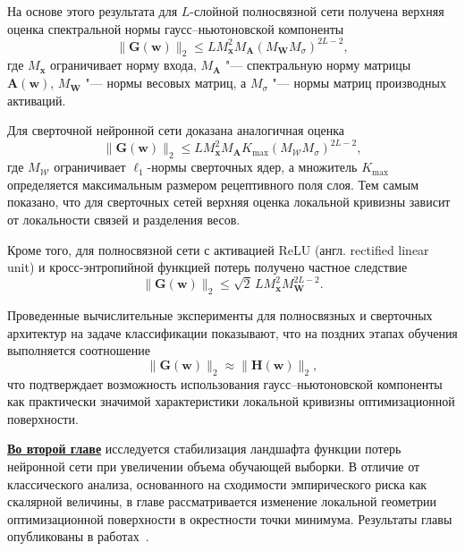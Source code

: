 На основе этого результата для $L$-слойной полносвязной сети получена верхняя оценка спектральной нормы гаусс--ньютоновской компоненты
\begin{equation}
\|\mathbf G(\mathbf w)\|_2
\le
L M_{\mathbf x}^2 M_{\mathbf A}
\left(M_{\mathbf W}M_{\sigma}\right)^{2L-2},
\end{equation}
где $M_{\mathbf x}$ ограничивает норму входа, $M_{\mathbf A}$ "--- спектральную норму матрицы $\mathbf A(\mathbf w)$, $M_{\mathbf W}$ "--- нормы весовых матриц, а $M_{\sigma}$ "--- нормы матриц производных активаций.

Для сверточной нейронной сети доказана аналогичная оценка
\begin{equation}
\|\mathbf G(\mathbf w)\|_2
\le
L M_{\mathbf x}^2 M_{\mathbf A} K_{\max}
\left(M_{\mathcal W}M_{\sigma}\right)^{2L-2},
\end{equation}
где $M_{\mathcal W}$ ограничивает $\ell_1$-нормы сверточных ядер, а множитель $K_{\max}$ определяется максимальным размером рецептивного поля слоя. Тем самым показано, что для сверточных сетей верхняя оценка локальной кривизны зависит от локальности связей и разделения весов.

Кроме того, для полносвязной сети с активацией ReLU (англ. rectified linear unit) и кросс-энтропийной функцией потерь получено частное следствие
\begin{equation}
\|\mathbf G(\mathbf w)\|_2
\le
\sqrt{2}\,L M_{\mathbf x}^2 M_{\mathbf W}^{2L-2}.
\end{equation}

Проведенные вычислительные эксперименты для полносвязных и сверточных архитектур на задаче классификации показывают, что на поздних этапах обучения выполняется соотношение
\[
\|\mathbf G(\mathbf w)\|_2 \approx \|\mathbf H(\mathbf w)\|_2,
\]
что подтверждает возможность использования гаусс--ньютоновской компоненты как практически значимой характеристики локальной кривизны оптимизационной поверхности.

\underline{\textbf{Во второй главе}} исследуется стабилизация ландшафта функции потерь нейронной сети при увеличении объема обучающей выборки. В отличие от классического анализа, основанного на сходимости эмпирического риска как скалярной величины, в главе рассматривается изменение локальной геометрии оптимизационной поверхности в окрестности точки минимума. Результаты главы опубликованы в работах~\cite{kiselev2024unraveling,kiselev2026ispras,kiselev2026conf68mipt,meshkov2024convnets}.

